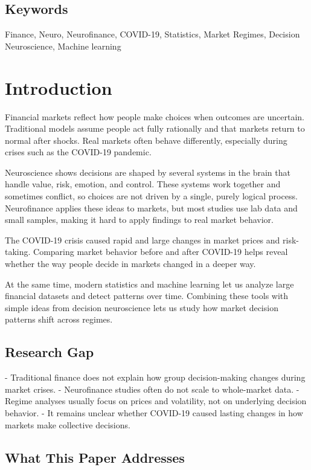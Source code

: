 \documentclass[conference]{IEEEtran}
\begin{document}
\begin{center}
\section{Keywords}
Finance, Neuro, Neurofinance, COVID-19, Statistics, Market Regimes, Decision Neuroscience, Machine learning 
\end{center}
\section{Introduction}

Financial markets reflect how people make choices when outcomes are uncertain. Traditional models assume people act fully rationally and that markets return to normal after shocks. Real markets often behave differently, especially during crises such as the COVID-19 pandemic.

Neuroscience shows decisions are shaped by several systems in the brain that handle value, risk, emotion, and control. These systems work together and sometimes conflict, so choices are not driven by a single, purely logical process. Neurofinance applies these ideas to markets, but most studies use lab data and small samples, making it hard to apply findings to real market behavior.

The COVID-19 crisis caused rapid and large changes in market prices and risk-taking. Comparing market behavior before and after COVID-19 helps reveal whether the way people decide in markets changed in a deeper way.

At the same time, modern statistics and machine learning let us analyze large financial datasets and detect patterns over time. Combining these tools with simple ideas from decision neuroscience lets us study how market decision patterns shift across regimes.

\subsection{Research Gap}

- Traditional finance does not explain how group decision-making changes during market crises.
- Neurofinance studies often do not scale to whole-market data.
- Regime analyses usually focus on prices and volatility, not on underlying decision behavior.
- It remains unclear whether COVID-19 caused lasting changes in how markets make collective decisions.

\subsection{What This Paper Addresses}
\end{document}
